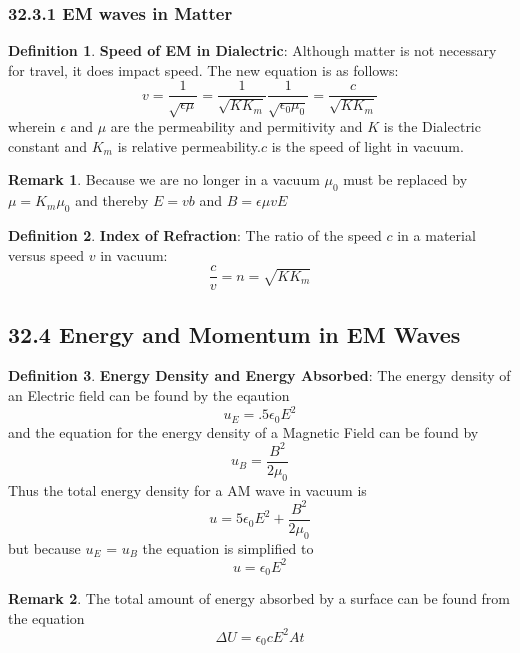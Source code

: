 \documentclass[12pt]{amsart}
\theoremstyle{definition}
\newtheorem{definition}{Definition} %
\newtheorem*{remark}{Remark}        %
\numberwithin{equation}{theorem}    %
\begin{document}
\subsubsection*{32.3.1 EM waves in Matter}

\begin{definition}
    \textbf{Speed of EM in Dialectric}:
    Although matter is not necessary for travel, it does impact speed. The new equation is as follows:
    $$v = \frac{1}{\sqrt{\epsilon\mu}} = \frac{1}{\sqrt{KK_m}}\frac{1}{\sqrt{\epsilon_0\mu_0}} = \frac{c}{\sqrt{KK_m}}$$
    wherein $\epsilon$ and $\mu$ are the permeability and permitivity and $K$ is the Dialectric constant and $K_m$ is relative permeability.$c$ is the speed of light in vacuum.
    \begin{remark}
        Because we are no longer in a vacuum $\mu_0$ must be replaced by $\mu = K_m\mu_0$ and thereby $E = vb$ and $B=\epsilon\mu vE$
    \end{remark}
\end{definition}

\begin{definition}
    \textbf{Index of Refraction}:
    The ratio of the speed $c$ in a material versus speed $v$ in vacuum:$$\frac{c}{v} = n = \sqrt{KK_m}$$
\end{definition}

\subsection*{32.4 Energy and Momentum in EM Waves}

\begin{definition}
    \textbf{Energy Density and Energy Absorbed}:
    The energy density of an Electric field can be found by the eqaution $$u_E = .5\epsilon_0E^2$$
    and the equation for the energy density of a Magnetic Field can be found by $$u_B = \frac{B^2}{2\mu_0}$$
    Thus the total energy density for a AM wave in vacuum is $$u =5\epsilon_0E^2 + \frac{B^2}{2\mu_0}$$ but because $u_E$ = $u_B$ the equation is simplified to $$u=\epsilon_0E^2$$
    \begin{remark}
        The total amount of energy absorbed by a surface can be found from the equation
        $$\Delta U = \epsilon_0cE^2At$$
    \end{remark}
\end{definition}
\end{document}
